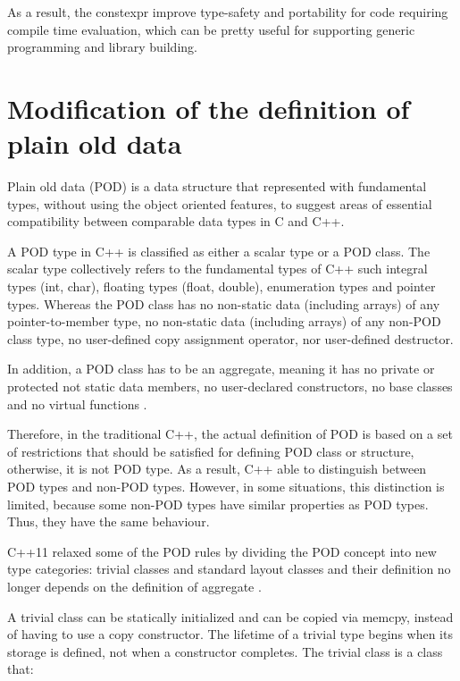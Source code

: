 \documentclass[11pt]{report}
\begin{document}
As a result, the constexpr improve type-safety and portability for code requiring compile time evaluation, which can be pretty useful for supporting generic programming and library building.

\section{Modification of the definition of plain old data}
\label{section: Modification of the definition of plain old data}
Plain old data (POD) is a data structure that represented with fundamental types, without using the object oriented features, to suggest areas of essential compatibility between comparable data types in C and C++.


A POD type in C++ is classified as either a scalar type or a POD class. The scalar type collectively refers to the fundamental types of C++ such integral types (int, char), floating types (float, double), enumeration types and pointer types. Whereas the POD class has no non-static data (including arrays) of any pointer-to-member type, no non-static data (including arrays) of any non-POD class type, no user-defined copy assignment operator, nor user-defined destructor.


In addition, a POD class has to be an aggregate, meaning it has no private or protected not static data members, no user-declared constructors, no base classes and no virtual functions \cite{Kalev:1999:ACP}.


Therefore, in the traditional C++, the actual definition of POD is based on a set of restrictions that should be satisfied for defining POD class or structure, otherwise, it is not POD type. As a result, C++ able to distinguish between POD types and non-POD types. However, in some situations, this distinction is limited, because some non-POD types have similar properties as POD types. Thus, they have the same behaviour.


C++11 relaxed some of the POD rules by dividing the POD concept into new type categories: trivial classes and standard layout classes and their definition no longer depends on the definition of aggregate \cite{MSDN:2012:CppModern}.


A trivial class can be statically initialized and can be copied via memcpy, instead of having to use a copy constructor. The lifetime of a trivial type begins when its storage is defined, not when a constructor completes. The trivial class is a class that:
\end{document}
